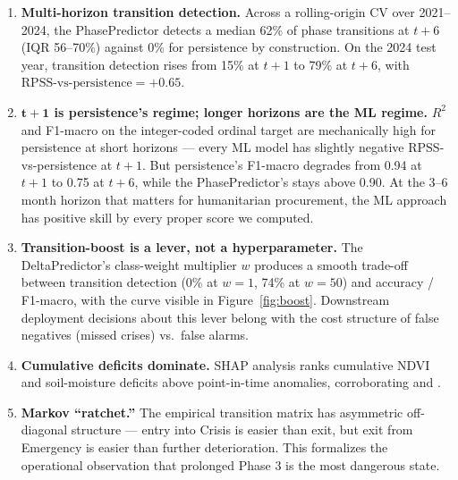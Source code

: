 \documentclass[11pt,letterpaper]{article}
\begin{document}
\begin{enumerate}
  \item \textbf{Multi-horizon transition detection.} Across a rolling-origin CV over 2021--2024, the PhasePredictor detects a median 62\% of phase transitions at $t\!+\!6$ (IQR 56--70\%) against 0\% for persistence by construction. On the 2024 test year, transition detection rises from 15\% at $t\!+\!1$ to 79\% at $t\!+\!6$, with $\text{RPSS-vs-persistence} = +0.65$.

  \item \textbf{$\boldsymbol{t\!+\!1}$ is persistence's regime; longer horizons are the ML regime.} $R^2$ and F1-macro on the integer-coded ordinal target are mechanically high for persistence at short horizons --- every ML model has slightly negative RPSS-vs-persistence at $t\!+\!1$. But persistence's F1-macro degrades from 0.94 at $t\!+\!1$ to 0.75 at $t\!+\!6$, while the PhasePredictor's stays above 0.90. At the 3--6 month horizon that matters for humanitarian procurement, the ML approach has positive skill by every proper score we computed.

  \item \textbf{Transition-boost is a lever, not a hyperparameter.} The DeltaPredictor's class-weight multiplier $w$ produces a smooth trade-off between transition detection (0\% at $w = 1$, 74\% at $w = 50$) and accuracy / F1-macro, with the curve visible in Figure~\ref{fig:boost}. Downstream deployment decisions about this lever belong with the cost structure of false negatives (missed crises) vs.\ false alarms.

  \item \textbf{Cumulative deficits dominate.} SHAP analysis ranks cumulative NDVI and soil-moisture deficits above point-in-time anomalies, corroborating \citet{funk2015} and \citet{lentz2019}.

  \item \textbf{Markov ``ratchet.''} The empirical transition matrix has asymmetric off-diagonal structure --- entry into Crisis is easier than exit, but exit from Emergency is easier than further deterioration. This formalizes the operational observation that prolonged Phase 3 is the most dangerous state.
\end{enumerate}
\end{document}
